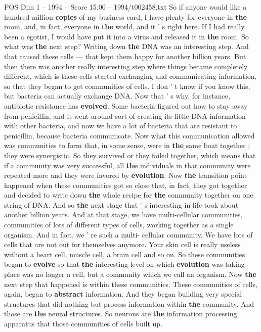\begin{textsample}{POS Dim 1 – 1994 – Score 15.00 – 1994/t002458.txt}
So if anyone would like a hundred million \textbf{copies} of my business card, I have plenty for everyone in \textbf{the} room, and, in fact, everyone in \textbf{the} world, and it ' s right here.
If I had really been a egotist, I would have put it into a virus and released it in \textbf{the} room.
So what was \textbf{the} next step?
Writing down \textbf{the} DNA was an interesting step.
And that caused these cells — that kept them happy for another billion years.
But then there was another really interesting step where things became completely different, which is these cells started exchanging and communicating information, so that they began to get communities of cells.
I don ' t know if you know this, but bacteria can actually exchange DNA.
Now that ' s why, for instance, antibiotic resistance has \textbf{evolved}.
Some bacteria figured out how to stay away from penicillin, and it went around sort of creating its little DNA information with other bacteria, and now we have a lot of bacteria that are resistant to penicillin, because bacteria communicate.
Now what this communication allowed was communities to form that, in some sense, were in \textbf{the} same boat together ; they were synergistic.
So they survived or they failed together, which means that if a community was very successful, all \textbf{the} individuals in that community were repeated more and they were favored by \textbf{evolution}.
Now \textbf{the} transition point happened when these communities got so close that, in fact, they got together and decided to write down \textbf{the} whole recipe for \textbf{the} community together on one string of DNA.
And so \textbf{the} next stage that ' s interesting in life took about another billion years.
And at that stage, we have multi-cellular communities, communities of lots of different types of cells, working together as a single organism.
And in fact, we ' re such a multi- cellular community.
We have lots of cells that are not out for themselves anymore.
Your skin cell is really useless without a heart cell, muscle cell, a brain cell and so on.
So these communities began to \textbf{evolve} so that \textbf{the} interesting level on which \textbf{evolution} was taking place was no longer a cell, but a community which we call an organism.
Now \textbf{the} next step that happened is within these communities.
These communities of cells, again, began to \textbf{abstract} information.
And they began building very special structures that did nothing but process information within \textbf{the} community.
And those are \textbf{the} neural structures.
So neurons are \textbf{the} information processing apparatus that those communities of cells built up.

\end{textsample}
